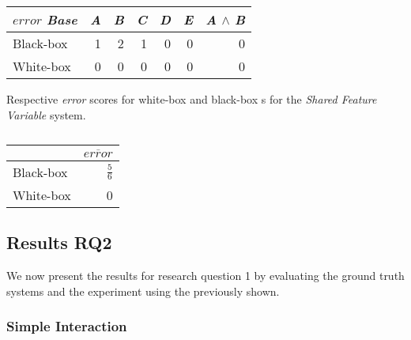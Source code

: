         \begin{table}[H]
            \begin{minipage}{.5\linewidth}
                \centering
                \begin{tabular}{lrrrrrr}    \toprule
                $error$    \emph{Base} & \emph{A} & \emph{B} & \emph{C} & \emph{D} & \emph{E} & \emph{A} $\land$ \emph{B}   \\ \midrule
                Black-box & 1 & 2 & 1 & 0 & 0 & 0       \\
                White-box & 0 & 0 & 0 & 0 & 0 & 0      \\ \bottomrule
                \end{tabular}
                \caption{Respective \emph{error} scores for white-box and black-box {\perfInfluenceModel}s for the \emph{Shared Feature Variable} system.}
            \end{minipage}%
            \hspace{7mm}
            \begin{minipage}{.3\linewidth}
                \centering
                \begin{tabular}{lr}
                    \toprule
                              & $\overline{error}$   \\ \midrule
                    Black-box & $\frac{5}{6}$              \\
                    White-box & 0              \\ \bottomrule
                    \end{tabular}
                    \caption{}  
                \end{minipage}
            \end{table}


\subsection{Results RQ2}

We now present the results for research question 1 by evaluating the ground truth systems and the experiment using the {\perfInfluenceModel} 
previously shown.

\subsubsection*{Simple Interaction}

